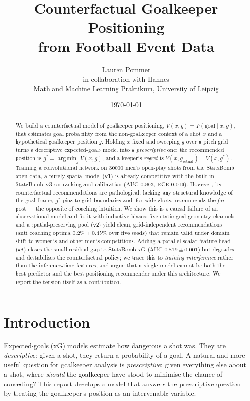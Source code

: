 \documentclass[11pt,a4paper]{article}
\title{\textbf{Counterfactual Goalkeeper Positioning\\ from Football Event Data}}
\author{Lauren Pommer\\[2pt]
  \small in collaboration with Hannes\\
  \small Math and Machine Learning Praktikum, University of Leipzig}
\date{\today}
\newcommand{\gopt}{g^{*}}
\newcommand{\V}{V}
\newcommand{\argmin}{\operatorname*{arg\,min}}
\begin{document}
\maketitle

\begin{abstract}
\noindent
We build a counterfactual model of goalkeeper positioning,
$\V(x,g)=P(\text{goal}\mid x,g)$, that estimates goal probability from the
non-goalkeeper context of a shot $x$ and a hypothetical goalkeeper position $g$.
Holding $x$ fixed and sweeping $g$ over a pitch grid turns a descriptive
expected-goals model into a \emph{prescriptive} one: the recommended position is
$\gopt=\argmin_g \V(x,g)$, and a keeper's \emph{regret} is
$\V(x,g_{\text{actual}})-\V(x,\gopt)$. Training a convolutional network on
\num{30000} men's open-play shots from the StatsBomb open data, a purely spatial
model (\texttt{v1}) is already competitive with the built-in StatsBomb xG on
ranking and calibration (AUC \num{0.803}, ECE \num{0.010}). However, its
counterfactual recommendations are pathological: lacking any structural
knowledge of the goal frame, $\gopt$ pins to grid boundaries and, for wide
shots, recommends the \emph{far} post --- the opposite of coaching intuition.
We show this is a causal failure of an observational model and fix it with
inductive biases: five static goal-geometry channels and a spatial-preserving
pool (\texttt{v2}) yield clean, grid-independent recommendations
(anti-coaching optima $0.2\%\pm0.45\%$ over five seeds) that remain valid under
domain shift to women's and other men's competitions. Adding a parallel
scalar-feature head (\texttt{v3}) closes the small residual gap to StatsBomb xG
(AUC $0.819\pm0.001$) but degrades and destabilises the counterfactual policy;
we trace this to \emph{training interference} rather than the inference-time
features, and argue that a single model cannot be both the best predictor and
the best positioning recommender under this architecture. We report the tension
itself as a contribution.
\end{abstract}

\section{Introduction}

Expected-goals (xG) models estimate how dangerous a shot was. They are
\emph{descriptive}: given a shot, they return a probability of a goal. A natural
and more useful question for goalkeeper analysis is \emph{prescriptive}: given
everything else about a shot, where \emph{should} the goalkeeper have stood to
minimise the chance of conceding? This report develops a model that answers the
prescriptive question by treating the goalkeeper's position as an intervenable
variable.
\end{document}
